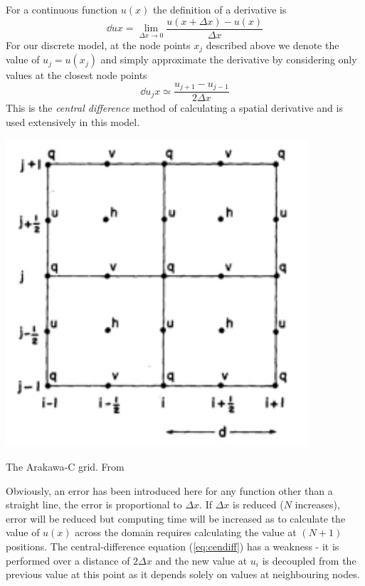 \documentclass[a4paper]{tufte-handout}
\begin{document}
  For a continuous function $u(x)$ the definition of a derivative is
  \begin{equation}
    \dd{u}{x} = \lim_{\Delta x \to 0} \frac{u(x + \Delta x) - u(x)}{\Delta x}
  \end{equation}
  For our discrete model, at the node points $x_j$ described above we denote
  the value of $u_j = u(x_j)$ and simply approximate the derivative by considering
  only values at the closest node points
  \begin{equation}
    \label{eq:cendiff}
    \dd{u_j}{x} \simeq \frac{u_{j+1} - u_{j-1}}{2 \Delta x}
  \end{equation}
  This is the \emph{central difference} method of calculating a spatial derivative
  and is used extensively in this model.
  \begin{marginfigure}
    \includegraphics{cgrid}
    \caption{The Arakawa-C grid. From \citep{Arakawa:1981bx}}
    \label{fig:cgrid}
  \end{marginfigure}
  Obviously, an error has been introduced here for any function other than a
  straight line, the error is proportional to $\Delta x$.
  If $\Delta x$ is reduced ($N$ increases), error will be reduced but computing time will be
  increased as to calculate the value of $u(x)$ across the domain requires
  calculating the value at $(N+1)$ positions.
  The central-difference equation (\ref{eq:cendiff}) has a weakness - it is
  performed over a distance of $2 \Delta x$ and the new value at $u_i$ is
  decoupled from the previous value at this point as it depends solely on
  values at neighbouring nodes.
\end{document}
